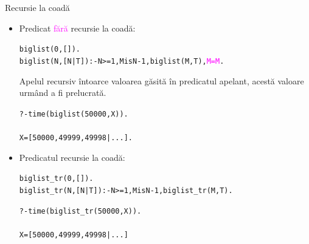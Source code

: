 \documentclass[xcolor=x11names,compress,10pt]{beamer}
\begin{document}
\begin{frame}{Recursie la coadă}

\vspace*{0.5cm}

\begin{itemize}
\item Predicat \textcolor{magenta}{fără} recursie la coadă:
\begin{alltt}
biglist(0,[]).\\
biglist(N,[N|T]) :- N >= 1, M is N-1,biglist(M,T),\textcolor{magenta}{M=M}.
\end{alltt}

Apelul recursiv întoarce valoarea găsită în predicatul apelant, acestă valoare urmând a fi prelucrată. \pause

\begin{alltt}
?- time(biglist(50000,X)).\\
\\
X = [50000, 49999, 49998|...] .
\end{alltt}\pause

\item Predicatul  recursie la coadă:
\begin{alltt}
biglist\_tr(0,[]).\\
biglist\_tr(N,[N|T]) :- N >= 1, M is N-1,biglist\_tr(M,T).\\
\pause

?- time(biglist\_tr(50000,X)).\\
\\
X = [50000, 49999, 49998|...]
\end{alltt} 

\end{itemize}
\end{frame}
\end{document}
